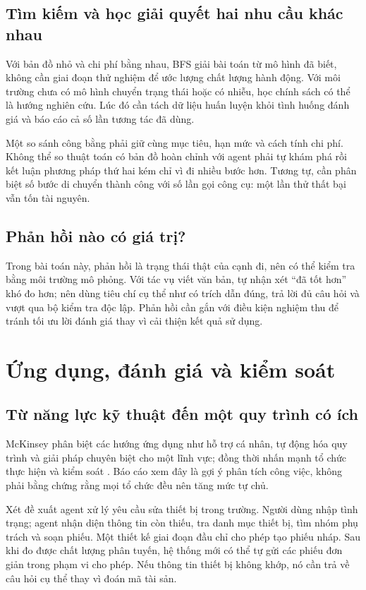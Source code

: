 \documentclass[12pt,a4paper]{article}
\begin{document}
\subsection{Tìm kiếm và học giải quyết hai nhu cầu khác nhau}
Với bản đồ nhỏ và chi phí bằng nhau, BFS giải bài toán từ mô hình đã biết, không cần
giai đoạn thử nghiệm để ước lượng chất lượng hành động. Với môi trường chưa có mô hình
chuyển trạng thái hoặc có nhiễu, học chính sách có thể là hướng nghiên cứu. Lúc đó cần
tách dữ liệu huấn luyện khỏi tình huống đánh giá và báo cáo cả số lần tương tác đã dùng.

Một so sánh công bằng phải giữ cùng mục tiêu, hạn mức và cách tính chi phí. Không thể
so thuật toán có bản đồ hoàn chỉnh với agent phải tự khám phá rồi kết luận phương pháp
thứ hai kém chỉ vì đi nhiều bước hơn. Tương tự, cần phân biệt số bước di chuyển thành
công với số lần gọi công cụ: một lần thử thất bại vẫn tốn tài nguyên.

\subsection{Phản hồi nào có giá trị?}
Trong bài toán này, phản hồi là trạng thái thật của cạnh đi, nên có thể kiểm tra bằng
môi trường mô phỏng. Với tác vụ viết văn bản, tự nhận xét ``đã tốt hơn'' khó đo hơn;
nên dùng tiêu chí cụ thể như có trích dẫn đúng, trả lời đủ câu hỏi và vượt qua bộ kiểm
tra độc lập. Phản hồi cần gắn với điều kiện nghiệm thu để tránh tối ưu lời đánh giá
thay vì cải thiện kết quả sử dụng.

\par
\section{Ứng dụng, đánh giá và kiểm soát}
\subsection{Từ năng lực kỹ thuật đến một quy trình có ích}
McKinsey phân biệt các hướng ứng dụng như hỗ trợ cá nhân, tự động hóa quy trình và giải
pháp chuyên biệt cho một lĩnh vực; đồng thời nhấn mạnh tổ chức thực hiện và kiểm soát
\cite{mckinsey}. Báo cáo xem đây là gợi ý phân tích công việc, không phải bằng chứng
rằng mọi tổ chức đều nên tăng mức tự chủ.

Xét đề xuất agent xử lý yêu cầu sửa thiết bị trong trường. Người dùng nhập tình trạng;
agent nhận diện thông tin còn thiếu, tra danh mục thiết bị, tìm nhóm phụ trách và soạn
phiếu. Một thiết kế giai đoạn đầu chỉ cho phép tạo phiếu nháp. Sau khi đo được chất
lượng phân tuyến, hệ thống mới có thể tự gửi các phiếu đơn giản trong phạm vi cho phép.
Nếu thông tin thiết bị không khớp, nó cần trả về câu hỏi cụ thể thay vì đoán mã tài sản.
\end{document}
